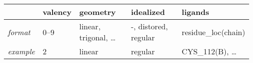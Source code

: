 \begin{tabular}{lllll}
  \toprule
  & valency & geometry & idealized & ligands \\
  \midrule
  \textit{format} & 0--9 & linear, trigonal, \ldots & -, distored, regular & residue\_loc(chain) \\
  \textit{example} & 2 & linear & regular & CYS\_112(B), \ldots \\ %
  \bottomrule
\end{tabular}
